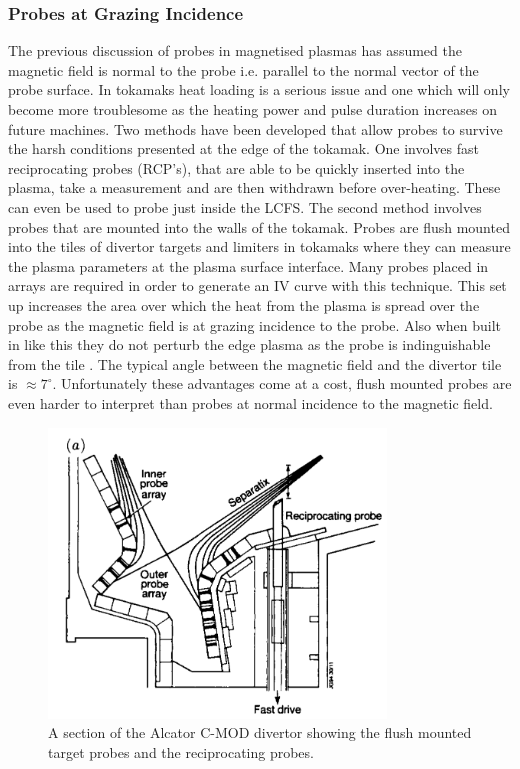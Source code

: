\documentclass[12pt]{article}
\begin{document}
\subsubsection{Probes at Grazing Incidence}
The previous discussion of probes in magnetised plasmas has assumed the magnetic field is normal to the probe i.e. parallel to the normal vector of the probe surface. In tokamaks heat loading is a serious issue and one which will only become more troublesome as the heating power and pulse duration increases on future machines. Two methods have been developed that allow probes to survive the harsh conditions presented at the edge of the tokamak. One involves fast reciprocating probes (RCP's), that are able to be quickly inserted into the plasma, take a measurement and are then withdrawn before over-heating. These can even be used to probe just inside the LCFS. The second method involves probes that are mounted into the walls of the tokamak. Probes are flush mounted into the tiles of divertor targets and limiters in tokamaks where they can measure the plasma parameters at the plasma surface interface. Many probes placed in arrays are required in order to generate an IV curve with this technique.  This set up increases the area over which the heat from the plasma is spread over the probe as the magnetic field is at grazing incidence to the probe. Also when built in like this they do not perturb the edge plasma as the probe is indinguishable from the tile \cite{stangeby-2000}. The typical angle between the magnetic field and the divertor tile is $\approx 7 ^{\circ}$.  Unfortunately these advantages come at a cost, flush mounted probes are even harder to interpret than probes at normal incidence to the magnetic field. 
\begin{figure}[H]
\centering
\includegraphics[width=0.8\textwidth]{flushmounted}
\caption{A section of the Alcator C-MOD divertor showing the flush mounted target probes and the reciprocating probes.}
\label{fig:shape}
\end{figure}
\end{document}
